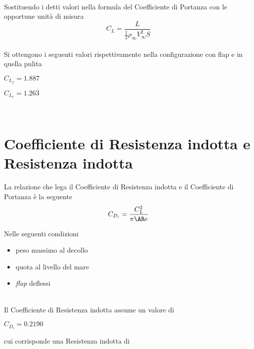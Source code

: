 \noindent \\
Sostituendo i detti valori nella formula del Coefficiente di Portanza con le opportune unità di misura \\


\begin{equation}
\label{eqn:cl}
C_L=\frac {L}{{\frac{1}{2}{\rho_{\infty}}V_{\infty}^2S}}
\end{equation}
\noindent \\

Si ottengono i seguenti valori rispettivamente nella configurazione con flap e in quella pulita

\begin{center}
$C_{L_f}= 1.887 $
\end {center}

\begin{center}
$C_{L_c}= 1.263 $
\end {center}

\noindent \\ 

\section{ Coefficiente di Resistenza indotta e Resistenza indotta}

La relazione che lega il Coefficiente di Resistenza indotta e il Coefficiente di Portanza  è la seguente \\

\begin{equation}
\label{eqn:cdi}
C_{D_ i}=\frac {C_L^2}{{\pi}{\AR}e}
\end{equation}

Nelle seguenti condizioni \\ 
\begin {itemize}
\item peso massimo al decollo
\item quota al livello del mare
\item  {\itshape flap} deflessi 
\end{itemize}

\noindent \\

Il Coefficiente di Resistenza indotta assume un valore di \\

\begin{center}
$C_{D_i}= 0.2190$
\end {center}

cui corrisponde una Resistenza indotta di


